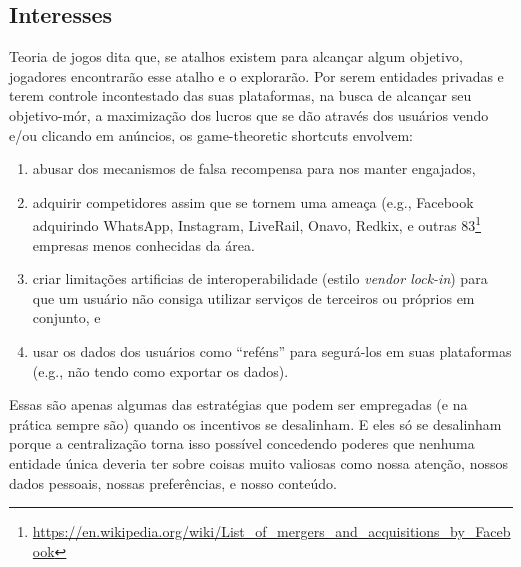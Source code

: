 


\subsection{Interesses}

Teoria de jogos dita que, se atalhos existem para alcançar algum objetivo, jogadores encontrarão esse atalho e o explorarão.
Por serem entidades privadas e terem controle incontestado das suas plataformas, na busca de alcançar seu objetivo-mór, a maximização dos lucros que se dão através dos usuários vendo e/ou clicando em anúncios, os game-theoretic shortcuts envolvem:

\begin{enumerate}
    \item abusar dos mecanismos de falsa recompensa  para nos manter engajados,
    \item adquirir competidores assim que se tornem uma ameaça (e.g., Facebook adquirindo WhatsApp, Instagram, LiveRail, Onavo, Redkix, e outras 83\footnote{\url{https://en.wikipedia.org/wiki/List_of_mergers_and_acquisitions_by_Facebook}} empresas menos conhecidas da área.
    \item criar limitações artificias de interoperabilidade (estilo \textit{vendor lock-in}) para que um usuário não consiga utilizar serviços de terceiros ou próprios em conjunto, e
    \item usar os dados dos usuários como ``reféns'' para segurá-los em suas plataformas (e.g., não tendo como exportar os dados).
\end{enumerate}

Essas são apenas algumas das estratégias que podem ser empregadas (e na prática sempre são) quando os incentivos se desalinham.
E eles só se desalinham porque a centralização torna isso possível concedendo poderes que nenhuma entidade única deveria ter sobre coisas muito valiosas como nossa atenção, nossos dados pessoais, nossas preferências, e nosso conteúdo.

